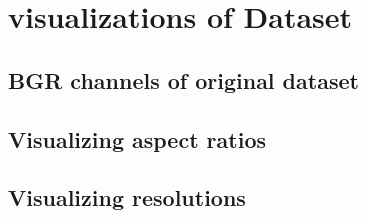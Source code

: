 \section{visualizations of Dataset}

\subsection{BGR channels of original dataset}

\subsection{Visualizing aspect ratios}

\subsection{Visualizing resolutions}